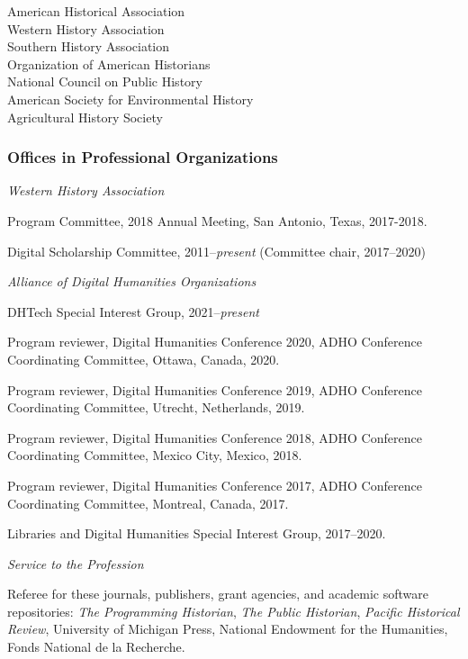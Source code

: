 American Historical Association\\
Western History Association\\
Southern History Association\\
Organization of American Historians\\
National Council on Public History\\
American Society for Environmental History\\
Agricultural History Society

\subsubsection{Offices in Professional
Organizations}\label{offices-in-professional-organizations}

\emph{Western History Association}

Program Committee, 2018 Annual Meeting, San Antonio, Texas, 2017-2018.

Digital Scholarship Committee, 2011--\emph{present} (Committee chair,
2017--2020)

\vspace{.4cm}

\emph{Alliance of Digital Humanities Organizations}

DHTech Special Interest Group, 2021--\emph{present}

Program reviewer, Digital Humanities Conference 2020, ADHO Conference
Coordinating Committee, Ottawa, Canada, 2020.

Program reviewer, Digital Humanities Conference 2019, ADHO Conference
Coordinating Committee, Utrecht, Netherlands, 2019.

Program reviewer, Digital Humanities Conference 2018, ADHO Conference
Coordinating Committee, Mexico City, Mexico, 2018.

Program reviewer, Digital Humanities Conference 2017, ADHO Conference
Coordinating Committee, Montreal, Canada, 2017.

Libraries and Digital Humanities Special Interest Group, 2017--2020.

\vspace{.4cm}

\emph{Service to the Profession}

Referee for these journals, publishers, grant agencies, and academic
software repositories: \emph{The Programming Historian}, \emph{The
Public Historian}, \emph{Pacific Historical Review}, University of
Michigan Press, National Endowment for the Humanities, Fonds National de
la Recherche.

